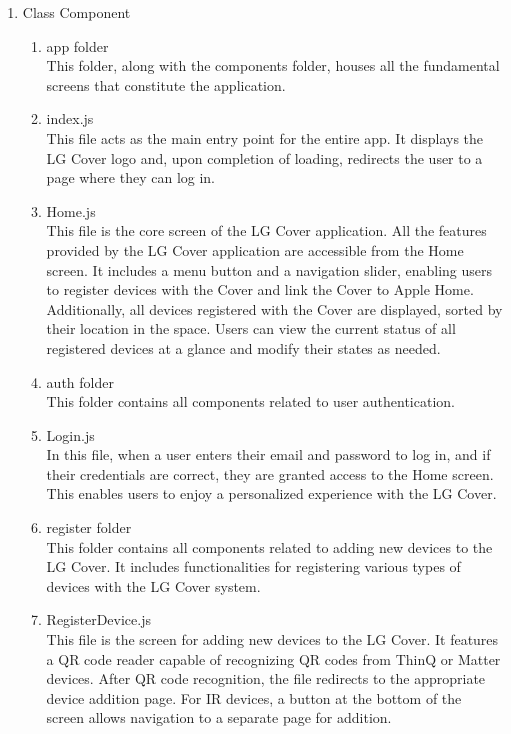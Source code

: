 \documentclass[conference]{IEEEtran}
\begin{document}
\begin{enumerate}[label=\arabic*.]
\item Class Component\\
\begin{enumerate}[label=\alph*.]
\item app folder\\
This folder, along with the components folder, houses all the fundamental screens that constitute the application.\\
\item index.js\\
This file acts as the main entry point for the entire app. It displays the LG Cover logo and, upon completion of loading, redirects the user to a page where they can log in.\\
\item Home.js\\
This file is the core screen of the LG Cover application. All the features provided by the LG Cover application are accessible from the Home screen. It includes a menu button and a navigation slider, enabling users to register devices with the Cover and link the Cover to Apple Home. Additionally, all devices registered with the Cover are displayed, sorted by their location in the space. Users can view the current status of all registered devices at a glance and modify their states as needed.\\
\item auth folder\\
This folder contains all components related to user authentication.\\
\item Login.js\\
In this file, when a user enters their email and password to log in, and if their credentials are correct, they are granted access to the Home screen. This enables users to enjoy a personalized experience with the LG Cover.\\
\item register folder\\
This folder contains all components related to adding new devices to the LG Cover. It includes functionalities for registering various types of devices with the LG Cover system.\\
\item RegisterDevice.js\\
This file is the screen for adding new devices to the LG Cover. It features a QR code reader capable of recognizing QR codes from ThinQ or Matter devices. After QR code recognition, the file redirects to the appropriate device addition page. For IR devices, a button at the bottom of the screen allows navigation to a separate page for addition.\\

\end{enumerate}
\end{enumerate}
\end{document}
